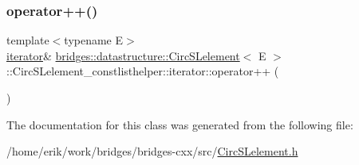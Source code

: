 \subsubsection{\texorpdfstring{operator++()}{operator++()}}
{\footnotesize\ttfamily template$<$typename E$>$ \\
\hyperlink{classbridges_1_1datastructure_1_1_circ_s_lelement_1_1_circ_s_lelement__constlisthelper_1_1iterator}{iterator}\& \hyperlink{classbridges_1_1datastructure_1_1_circ_s_lelement}{bridges\+::datastructure\+::\+Circ\+S\+Lelement}$<$ E $>$\+::Circ\+S\+Lelement\+\_\+constlisthelper\+::iterator\+::operator++ (\begin{DoxyParamCaption}{ }\end{DoxyParamCaption})\hspace{0.3cm}{\ttfamily [inline]}}



The documentation for this class was generated from the following file\+:\begin{DoxyCompactItemize}
\item 
/home/erik/work/bridges/bridges-\/cxx/src/\hyperlink{_circ_s_lelement_8h}{Circ\+S\+Lelement.\+h}\end{DoxyCompactItemize}
